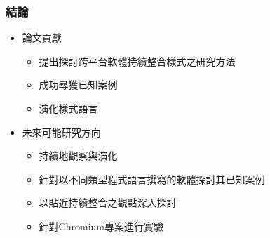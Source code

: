 \documentclass[utf8x]{beamer}
\begin{document}
\begin{frame}%
\frametitle{結論}%
\begin{itemize}
\setlength{\itemindent}{1em}
\item[] 論文貢獻
\begin{itemize}
\item 提出探討跨平台軟體持續整合樣式之研究方法
\item 成功尋獲已知案例
\item 演化樣式語言
\end{itemize}
\item[] 未來可能研究方向
\begin{itemize}
\item 持續地觀察與演化
\item 針對以不同類型程式語言撰寫的軟體探討其已知案例
\item 以貼近持續整合之觀點深入探討
\item 針對Chromium專案進行實驗
\end{itemize}
\end{itemize}
\end{frame}

\end{document}
